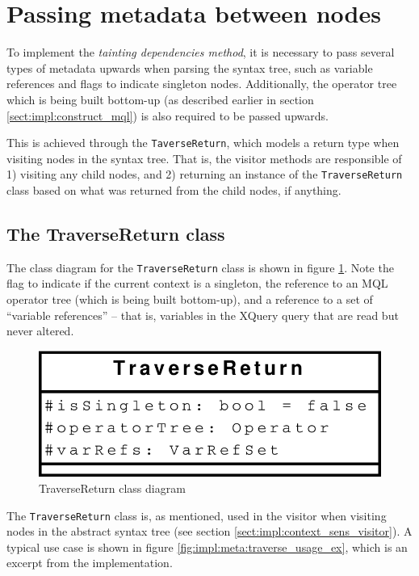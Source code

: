 \section{Passing metadata between nodes}
To implement the \textit{tainting dependencies method}, it is necessary to pass
several types of metadata upwards when parsing the syntax tree, such as
variable references and flags to indicate singleton nodes. Additionally, the
operator tree which is being built bottom-up (as described earlier in section
\ref{sect:impl:construct_mql}) is also required to be passed upwards. 

This is achieved through the \texttt{TaverseReturn}, which models a return type
when visiting nodes in the syntax tree. That is, the visitor methods are
responsible of 1) visiting any child nodes, and 2) returning an instance of the
\texttt{TraverseReturn} class based on what was returned from the child nodes,
if anything.

\subsection{The TraverseReturn class}
The class diagram for the \texttt{TraverseReturn} class is shown in figure
\ref{fig:impl:meta:traverse_uml}. Note the flag to indicate if the current
context is a singleton, the reference to an MQL operator tree (which is being
built bottom-up), and a reference to a set of ``variable references'' -- that
is, variables in the XQuery query that are read but never altered.

\begin{figure}[!htp]
\begin{center}
  \includegraphics[scale=0.5]{diagrams/traversereturn_uml}
  \caption{TraverseReturn class diagram}
  \label{fig:impl:meta:traverse_uml}
\end{center}
\end{figure}

The \texttt{TraverseReturn} class is, as mentioned, used in the visitor when
visiting nodes in the abstract syntax tree (see section
\ref{sect:impl:context_sens_visitor}). A typical use case is shown in figure
\ref{fig:impl:meta:traverse_usage_ex}, which is an excerpt from the
implementation.

